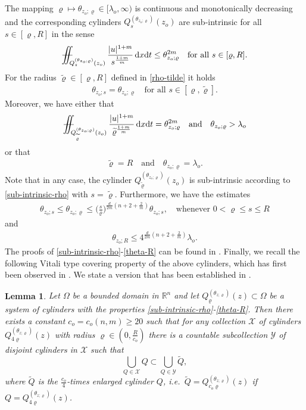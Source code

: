 \documentclass[a4paper, 10pt, american]{amsart}
\newtheorem{lemma}[theorem]{Lemma}
\numberwithin{theorem}{section}
\numberwithin{equation}{section}
\def\R{\mathbb{R}}
\newcommand{\dxdt}{\,\mathrm{d}x\mathrm{d}t}
\renewcommand{\rho}{\varrho}
\newcommand{\abs}[1]{|#1|}
\def\Xiint#1{\mathchoice
    {\XXiint\displaystyle\textstyle{#1}}%
    {\XXiint\textstyle\scriptstyle{#1}}%
    {\XXiint\scriptstyle\scriptscriptstyle{#1}}%
    {\XXiint\scriptscriptstyle\scriptscriptstyle{#1}}%
    \!\iint}
\def\XXiint#1#2#3{\setbox0=\hbox{$#1{#2#3}{\iint}$}
    \vcenter{\hbox{$#2#3$}}\kern-0.5\wd0}
\def\biint{\Xiint{-\!-}}
\def\Tilde{\widetilde}
\begin{document}
The mapping $\rho\mapsto\theta_{z_o;\rho}\in[\lambda_o,\infty)$ is
continuous and monotonically decreasing and the corresponding
cylinders $Q_s^{(\theta_{z_o;\rho})}(z_o)$ are sub-intrinsic for all
$s\in[\rho,R]$ in the sense 
\begin{align}\label{sub-intrinsic-rho}
	\biint_{Q_{s}^{(\theta_{z_o;\rho})}(z_o)} \frac{\abs{u}^{1+m}}{s^\frac{1+m}m} \dxdt
	\le 
	\theta_{z_o;\rho}^{2m}
	\quad\mbox{for all $s\in[\rho, R]$.}
\end{align}
For the radius $\Tilde{\rho}\in[\rho,R]$ defined in \eqref{rho-tilde}
it holds 
\begin{align}\label{tilde-rho}
\theta_{z_o;s}=\theta_{z_o;\rho}\quad\mbox{for all $s\in[\rho,\Tilde{\rho}]$}.
\end{align}
Moreover, we have either that
\begin{align}\label{intrinsic-tilde-rho}
	\biint_{Q_{\Tilde{\rho}}^{(\theta_{z_o;\rho})}(z_o)} \frac{\abs{u}^{1+m}}{\Tilde{\rho}^\frac{1+m}m} \dxdt
	= 
	\theta_{z_o;\rho}^{2m}
\quad
\mbox{and}
\quad
\theta_{z_o;\rho}>\lambda_o
\end{align}
or that 
\begin{align}\label{tilde-rho-R}
\Tilde{\rho}=R\quad\mbox{and}\quad \theta_{z_o;\rho}=\lambda_o.
\end{align}
Note that in any case, the cylinder $Q_{\Tilde{\rho}}^{(\theta_{z_o;\rho})}(z_o)$
is sub-intrinsic according to \eqref{sub-intrinsic-rho} with $s=\Tilde\rho$.
Furthermore, we have the estimates 
\begin{align}\label{theta-compare}
\theta_{z_o;s}
\le
\theta_{z_o;\rho}
\le
\bigg(\frac{s}{\rho}\bigg)^{\frac{d}{2m}(n+2+\frac2m)}\theta_{z_o;s}, \quad\mbox{whenever $0<\rho\le s\le R$}
\end{align}
and 
\begin{align}\label{theta-R}
\theta_{z_o;R}\le4^{\frac{d}{2m}(n+2+\frac2m)}\lambda_o.
\end{align}
The proofs of \eqref{sub-intrinsic-rho}-\eqref{theta-R} can be found in \cite[Section 7.1]{BDS-singular-higher-int}.
Finally, we recall the following Vitali type covering property of the
above cylinders, which has first been observed in
\cite{Gianazza-Schwarzacher}. We state a version that has
been established in \cite[Lemma 7.1]{BDS-singular-higher-int}.
\begin{lemma}\label{lem:vitali}
Let $\Omega$ be a bounded domain in $\R^n$ and let
$Q_{\rho}^{(\theta_{z;\rho})}(z)\subset\Omega$ be a system of
cylinders with the properties \eqref{sub-intrinsic-rho}-\eqref{theta-R}.
Then there exists a constant $ c_o= c_o(n,m)\ge 20$ 
such that for any collection $\mathcal X$ of cylinders $Q_{4\rho}^{(\theta_{z;\rho})}(z)$ with radius $\rho\in(0,\tfrac{R}{ c_o})$ there is a countable subcollection $\mathcal Y$ of disjoint cylinders in $\mathcal X$ such that  
\begin{equation}\label{covering}
	\bigcup_{Q\in\mathcal X} Q
	\subset 
	\bigcup_{Q\in\mathcal Y} \Tilde Q,
\end{equation}
where $\Tilde Q$ is the $\frac{c_o}{4}$-times enlarged cylinder $Q$, i.e.~$\Tilde Q=Q_{c_o \rho}^{(\theta_{z;\rho})}(z)$ if $Q=Q_{4\rho}^{(\theta_{z;\rho})}(z)$.
\end{lemma}
\end{document}

